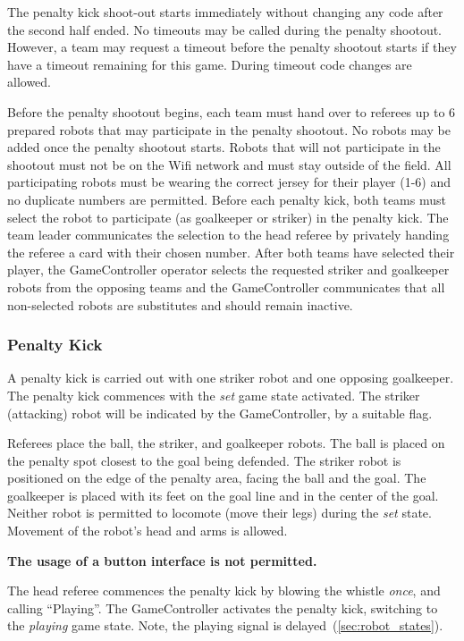 The penalty kick shoot-out starts immediately without changing any code after the second half ended. No timeouts may be called during the penalty shootout. However, a team may request a timeout before the penalty shootout starts if they have a timeout remaining for this game. During timeout code changes are allowed.

Before the penalty shootout begins, each team must hand over to referees up to 6 prepared robots that may participate in the penalty shootout. No robots may be added once the penalty shootout starts. Robots that will not participate in the shootout must not be on the Wifi network and must stay outside of the field. All participating robots must be wearing the correct jersey for their player (1-6) and no duplicate numbers are permitted. Before each penalty kick, both teams must select the robot to participate (as goalkeeper or striker) in the penalty kick. The team leader communicates the selection to the head referee by privately handing the referee a card with their chosen number. After both teams have selected their player, the GameController operator selects the requested striker and goalkeeper robots from the opposing teams and the GameController communicates that all non-selected robots are substitutes and should remain inactive.

\subsubsection{Penalty Kick}
\label{sec:penalty_kick}

A penalty kick is carried out with one striker robot and one opposing goalkeeper.
The penalty kick commences with the \textit{set} game state activated.
The striker (attacking) robot will be indicated by the GameController, by a suitable flag.

Referees place the ball, the striker, and goalkeeper robots. The ball is placed on the penalty spot closest to the goal being defended. The striker robot is positioned on the edge of the penalty area, facing the ball and the goal. The goalkeeper is placed with its feet on the goal line and in the center of the goal. Neither robot is permitted to locomote (move their legs) during the \textit{set} state. Movement of the robot's head and arms is allowed.

\textbf{The usage of a button interface is not permitted.}

The head referee commences the penalty kick by blowing the whistle \textit{once}, and calling ``Playing''.
The GameController activates the penalty kick, switching to the \emph{playing} game state.
Note, the playing signal is delayed~(\cf \cref{sec:robot_states}).

